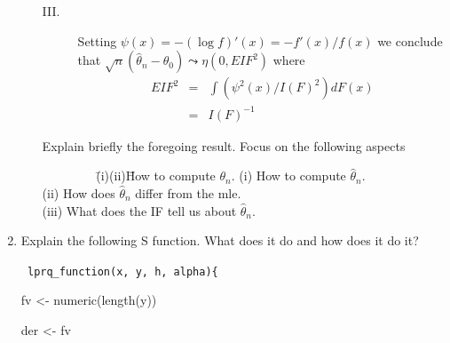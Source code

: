 \begin{enumerate}
\begin{enumerate}
\begin{description}
\item[\small III.] Setting $\psi(x) = - (\log f)'(x) = - f'(x)/f(x)$ we conclude that
$\sqrt{n}(\hat{\theta}_n-\theta_0) \leadsto \eta (0, EIF^2) $ where
\begin{eqnarray*}
EIF^2 &=& \int( \psi^2 (x)/I(F)^2)dF(x) \\
&=& I(F)^{-1}
\end{eqnarray*}
\end{description}
Explain briefly the foregoing result.  Focus on the following aspects
\begin{tabbing}
$\qquad \qquad$ \= (i)(ii)\= How to compute $\theta_n$. \kill
\> (i)\> How to compute $\hat \theta_n$. \\
\> (ii)\> How does $\hat{\theta}_n$ differ from the mle.\\
\> (iii)\> What does the IF tell us about $\hat \theta_n$.
\end{tabbing}
\end{enumerate}


%
%
%
%
%
%
\item Explain the following S function.  What does it do and how does it do
it?


{\tt
lprq\_function(x, y, h, alpha)\{ 

\hspace{10mm} fv <- numeric(length(y)) 

\hspace{10mm} der <- fv

}
\end{enumerate}
